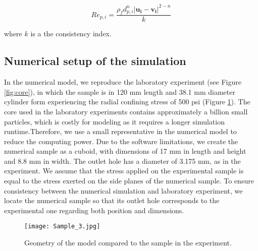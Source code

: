 \documentclass{article}
\begin{document}
\begin{equation}
Re_{p, i} = \frac{\rho_f d_{p, i}^n |\bm{u_i}-\bm{v_i}|^{2-n}}{k} \label{eq:11}
\end{equation}

where $k$ is a the consistency index.




\subsection{Numerical setup of the simulation}

In the numerical model, we reproduce the laboratory experiment (see Figure \ref{fig:core}), in which the sample is in 120 mm length and 38.1 mm diameter cylinder form experiencing the radial confining stress of 500 psi (Figure \ref{fig:sample}). The core used in the laboratory experiments contains approximately a billion small particles, which is costly for modeling as it requires a longer simulation runtime.Therefore, we use a small representative in the numerical model to reduce the computing power. Due to the software limitations, we create the numerical sample as a cuboid, with dimensions of 17 mm in length and height and 8.8 mm in width. The outlet hole has a diameter of 3.175 mm, as in the experiment. We assume that the stress applied on the experimental sample is equal to the stress exerted on the side planes of the numerical sample. To ensure consistency between the numerical simulation and laboratory experiment, we locate the numerical sample so that its outlet hole corresponds to the experimental one regarding both position and dimensions. 

\begin{figure}[H]
\begin{centering}
\texttt{[image: Sample\_3.jpg]}
\par\end{centering}
\caption{Geometry of the model compared to the sample in the experiment.\label{fig:sample}}
\end{figure}
\end{document}
